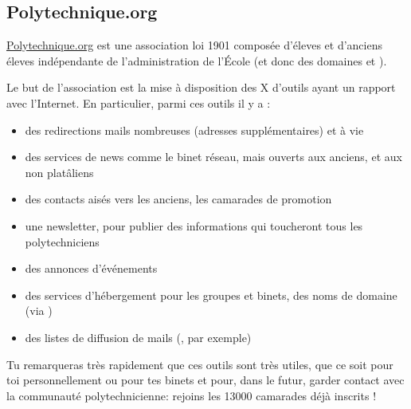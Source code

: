 \subsection{Polytechnique.org}
\url{Polytechnique.org} est une association loi 1901 compos\'ee d'\'eleves et d'anciens \'eleves 
 ind\'ependante de l'administration de l'\'Ecole (et donc des domaines 
 et ).

Le but de l'association est la mise \`a disposition des X d'outils ayant un rapport avec l'Internet. En particulier, parmi ces outils il y a :
\begin{itemize}
  \item des redirections mails nombreuses (adresses suppl\'ementaires) et \`a vie
  \item des services de news comme le binet r\'eseau, mais ouverts aux anciens, et aux non plat\^aliens
  \item des contacts ais\'es vers les anciens, les camarades de promotion
  \item une newsletter, pour publier des informations qui toucheront tous les polytechniciens
  \item des annonces d'\'ev\'enements
  \item des services d'h\'ebergement pour les groupes et binets, des noms de domaine (via )
  \item des listes de diffusion de mails (, par exemple)
\end{itemize}

Tu remarqueras tr\`es rapidement que ces outils sont tr\`es utiles, que ce soit pour toi personnellement ou pour tes binets et pour, dans le futur, garder contact avec la communaut\'e polytechnicienne: rejoins les 13000 camarades d\'ej\`a inscrits !
